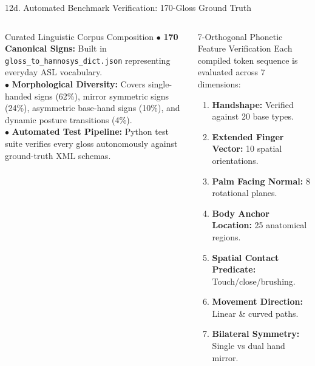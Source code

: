 \documentclass[aspectratio=169]{beamer}
\begin{document}
\begin{frame}[t]{12d. Automated Benchmark Verification: 170-Gloss Ground Truth}
\vspace{2.0mm}
\begin{columns}[T]
    \begin{block}{Curated Linguistic Corpus Composition}
        \fontsize{6.8pt}{8.6pt}\selectfont
        $\bullet$ \textbf{170 Canonical Signs:} Built in \texttt{gloss\_to\_hamnosys\_dict.json} representing everyday ASL vocabulary.\\
        $\bullet$ \textbf{Morphological Diversity:} Covers single-handed signs (62\%), mirror symmetric signs (24\%), asymmetric base-hand signs (10\%), and dynamic posture transitions (4\%).\\
        $\bullet$ \textbf{Automated Test Pipeline:} Python test suite verifies every gloss autonomously against ground-truth XML schemas.
    \end{block}

    \begin{block}{7-Orthogonal Phonetic Feature Verification}
        \fontsize{6.8pt}{8.6pt}\selectfont
        Each compiled token sequence is evaluated across 7 dimensions:
        \begin{enumerate}\setlength{\itemsep}{0.04cm}
            \item \textbf{Handshape:} Verified against 20 base types.
            \item \textbf{Extended Finger Vector:} 10 spatial orientations.
            \item \textbf{Palm Facing Normal:} 8 rotational planes.
            \item \textbf{Body Anchor Location:} 25 anatomical regions.
            \item \textbf{Spatial Contact Predicate:} Touch/close/brushing.
            \item \textbf{Movement Direction:} Linear \& curved paths.
            \item \textbf{Bilateral Symmetry:} Single vs dual hand mirror.
        \end{enumerate}
    \end{block}
\end{columns}
\end{frame}
\end{document}
